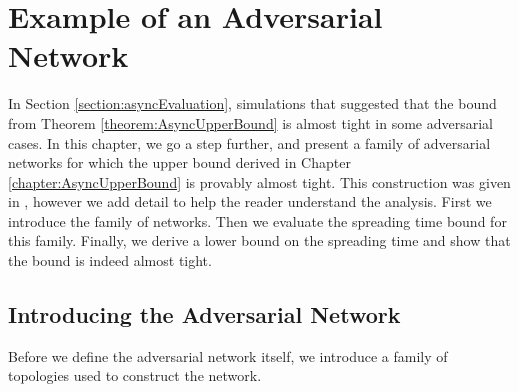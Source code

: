 \chapter{Example of an Adversarial Network}\label{chapter:asyncBoundTight}

In Section \ref{section:asyncEvaluation}, simulations that suggested that the bound from Theorem \ref{theorem:AsyncUpperBound} is almost tight in some adversarial cases. In this chapter, we go a step further, and present a family of adversarial networks for which the upper bound derived in Chapter \ref{chapter:AsyncUpperBound} is provably almost tight. This construction was given in \cite{asyncPaper}, however we add detail to help the reader understand the analysis. First we introduce the family of networks. Then we evaluate the spreading time bound for this family. Finally, we derive a lower bound on the spreading time and show that the bound is indeed almost tight.

\section{Introducing the Adversarial Network}

Before we define the adversarial network itself, we introduce a family of topologies used to construct the network.

